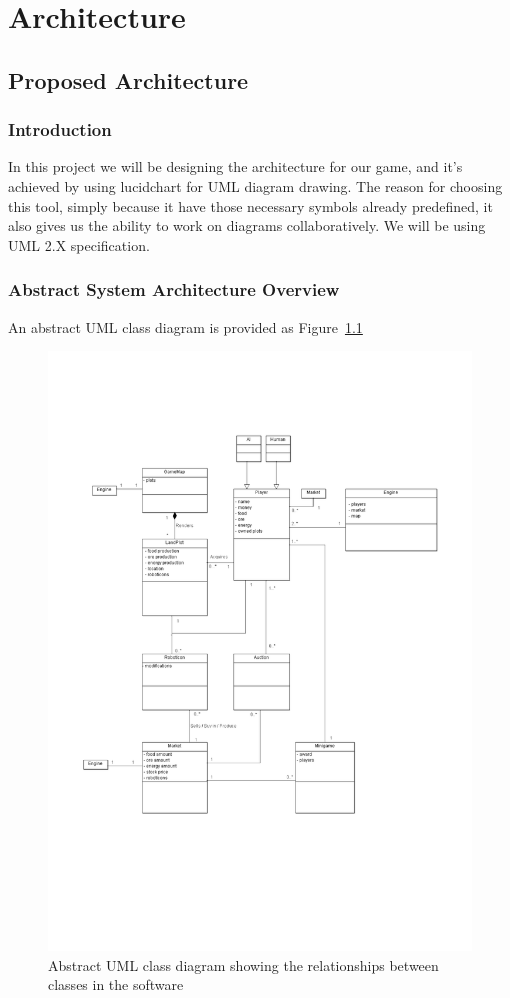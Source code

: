\chapter{Architecture}


\section{Proposed Architecture}
\subsection{Introduction}
In this project we will be designing the architecture for our game, and it’s achieved by using lucidchart for UML diagram drawing.
The reason for choosing this tool, simply because it have those necessary symbols already predefined, it also gives us the ability to work on diagrams collaboratively. We will be using UML 2.X specification.

\subsection{Abstract System Architecture Overview}
An abstract UML class diagram is provided as Figure~\ref{fig:classdiagram}
\begin{figure}[p]
	\begin{centering}
		\includegraphics{AbstractDiagram.pdf}
		\caption{Abstract UML class diagram showing the relationships between classes in the software}
		\label{fig:classdiagram}
	\end{centering}
\end{figure}

